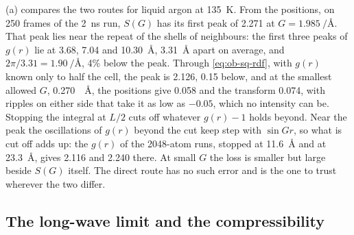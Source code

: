 (a) compares the two routes for liquid argon at
\SI{135}{\kelvin}. From the positions, on 250 frames of the
\SI{2}{\nano\second} run, $S(G)$ has its first peak of 2.271 at $G =
\SI{1.985}{\per\angstrom}$. That peak lies near the repeat of the shells
of neighbours: the first three peaks of $g(r)$ lie at 3.68, 7.04 and
\SI{10.30}{\angstrom}, \SI{3.31}{\angstrom} apart on average, and
$2\pi/3.31 = \SI{1.90}{\per\angstrom}$, 4\% below the peak. Through
\cref{eq:ob-sq-rdf}, with $g(r)$ known only to half the cell, the peak is
2.126, 0.15 below, and at the smallest allowed $G$,
\SI{0.270}{\per\angstrom}, the positions give 0.058 and the transform
0.074, with ripples on either side that take it as low as $-0.05$, which
no intensity can be. Stopping the integral at $L/2$ cuts off whatever
$g(r) - 1$ holds beyond. Near the peak the oscillations of $g(r)$ beyond
the cut keep step with $\sin Gr$, so what is cut off adds up: the $g(r)$
of the 2048-atom runs, stopped at \SI{11.6}{\angstrom} and at
\SI{23.3}{\angstrom}, gives 2.116 and 2.240 there. At small $G$ the loss
is smaller but large beside $S(G)$ itself. The direct route has no such
error and is the one to trust wherever the two differ.

\subsection*{The long-wave limit and the compressibility}

